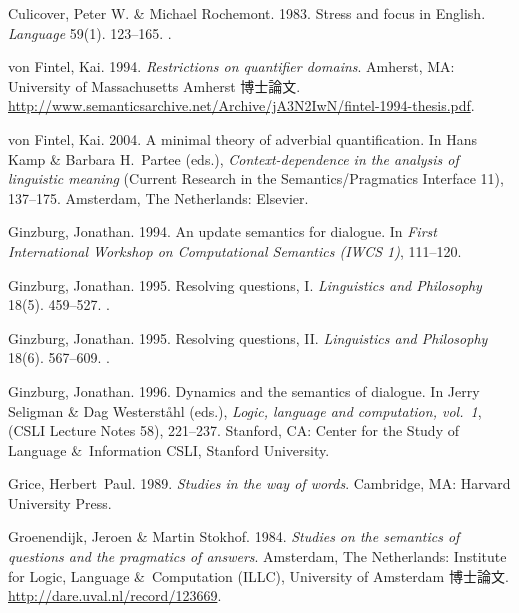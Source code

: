 \documentclass{goken}
\newcommand{\ori}[1]{\noindent\textcolor[gray]{0.7}{\fontsize{8pt}{8pt}\selectfont{\textsf{(p.~#1)}}} }
\begin{document}
\begin{thebibliography}{74}
Culicover, Peter W. \& Michael Rochemont. 1983.
\newblock Stress and focus in {E}nglish.
\newblock \emph{Language} 59(1). 123--165.
\newblock {}.

von Fintel, Kai. 1994.
\newblock \emph{Restrictions on quantifier domains}.
\newblock Amherst, MA: University of Massachusetts Amherst 博士論文.
\newblock
  \urlprefix\url{http://www.semanticsarchive.net/Archive/jA3N2IwN/fintel-1994-thesis.pdf}.

von Fintel, Kai. 2004.
\newblock A minimal theory of adverbial quantification.
\newblock In Hans Kamp \& Barbara H.~Partee (eds.), \emph{Context-dependence in
  the analysis of linguistic meaning} (Current Research in the
  Semantics/Pragmatics Interface 11), 137--175. Amsterdam, The Netherlands:
  Elsevier.

Ginzburg, Jonathan. 1994.
\newblock An update semantics for dialogue.
\newblock In \emph{First {I}nternational {W}orkshop on {C}omputational
  {S}emantics ({IWCS} 1)}, 111--120.

Ginzburg, Jonathan. 1995{}.
\newblock Resolving questions, {I}.
\newblock \emph{Linguistics and Philosophy} 18(5). 459--527.
\newblock {}.

Ginzburg, Jonathan. 1995{}.
\newblock Resolving questions, {II}.
\newblock \emph{Linguistics and Philosophy} 18(6). 567--609.
\newblock {}.

\ori{65}

Ginzburg, Jonathan. 1996.
\newblock Dynamics and the semantics of dialogue.
\newblock In Jerry Seligman \& Dag Westerst\r{a}hl (eds.), \emph{Logic,
  language and computation, vol.~1}, ({CSLI} Lecture Notes 58), 221--237.
  Stanford, CA: Center for the Study of Language \&\ Information {CSLI},
  Stanford University.

Grice, Herbert~Paul. 1989.
\newblock \emph{Studies in the way of words}.
\newblock Cambridge, MA: Harvard University Press.

Groenendijk, Jeroen \& Martin Stokhof. 1984.
\newblock \emph{Studies on the semantics of questions and the pragmatics of
answers}. Amsterdam, The Netherlands: Institute for Logic, Language \&\ Computation (ILLC), University of
Amsterdam 博士論文.
\newblock \urlprefix\url{http://dare.uval.nl/record/123669}.


\end{thebibliography}
\end{document}
